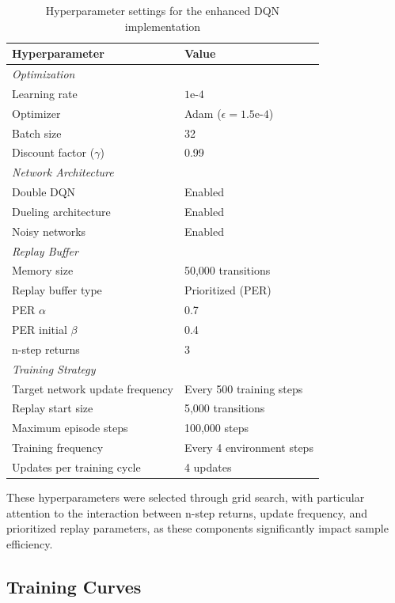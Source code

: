 \documentclass[a4paper]{article}
\begin{document}
\begin{table}[H]
\centering
\caption{Hyperparameter settings for the enhanced DQN implementation}
\label{tab:hyperparams}
\begin{tabular}{ll}
\toprule
\textbf{Hyperparameter} & \textbf{Value} \\
\midrule
\multicolumn{2}{l}{\textit{Optimization}} \\
Learning rate & $1\text{e-}4$ \\
Optimizer & Adam ($\epsilon=1.5\text{e-}4$) \\
Batch size & 32 \\
Discount factor ($\gamma$) & 0.99 \\
\midrule
\multicolumn{2}{l}{\textit{Network Architecture}} \\
Double DQN & Enabled \\
Dueling architecture & Enabled \\
Noisy networks & Enabled \\
\midrule
\multicolumn{2}{l}{\textit{Replay Buffer}} \\
Memory size & 50,000 transitions \\
Replay buffer type & Prioritized (PER) \\
PER $\alpha$ & 0.7 \\
PER initial $\beta$ & 0.4 \\
n-step returns & 3 \\
\midrule
\multicolumn{2}{l}{\textit{Training Strategy}} \\
Target network update frequency & Every 500 training steps \\
Replay start size & 5,000 transitions \\
Maximum episode steps & 100,000 steps \\
Training frequency & Every 4 environment steps \\
Updates per training cycle & 4 updates \\
\bottomrule
\end{tabular}
\end{table}

These hyperparameters were selected through grid search, with particular attention to the interaction between n-step returns, update frequency, and prioritized replay parameters, as these components significantly impact sample efficiency.


\subsection{Training Curves}
\end{document}
